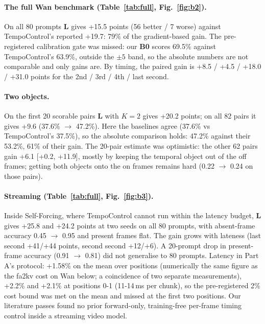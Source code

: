 \documentclass[10pt,a4paper]{article}
\newcommand{\arm}[1]{\textbf{#1}}
\begin{document}
\paragraph{The full Wan benchmark (Table~\ref{tab:full}, Fig.~\ref{fig:b2}).} On all 80 prompts \arm{L} gives +15.5 points (56 better / 7 worse) against TempoControl's reported +19.7: 79\% of the gradient-based gain. The pre-registered calibration gate was missed: our \arm{B0} scores 69.5\% against TempoControl's 63.9\%, outside the $\pm5$ band, so the absolute numbers are not comparable and only gains are. By timing, the paired gain is +8.5 / +4.5 / +18.0 / +31.0 points for the 2nd / 3rd / 4th / last second.

\paragraph{Two objects.} On the first 20 scorable pairs \arm{L} with $K=2$ gives +20.2 points; on all 82 pairs it gives +9.6 (37.6\% $\to$ 47.2\%). Here the baselines agree (37.6\% vs TempoControl's 37.5\%), so the absolute comparison holds: 47.2\% against their 53.2\%, 61\% of their gain. The 20-pair estimate was optimistic: the other 62 pairs gain +6.1 [+0.2, +11.9], mostly by keeping the temporal object out of the off frames; getting both objects onto the on frames remains hard (0.22 $\to$ 0.24 on those pairs).

\paragraph{Streaming (Table~\ref{tab:full}, Fig.~\ref{fig:b3}).} Inside Self-Forcing, where TempoControl cannot run within the latency budget, \arm{L} gives +25.8 and +24.2 points at two seeds on all 80 prompts, with absent-frame accuracy 0.45 $\to$ 0.95 and present frames flat. The gain grows with lateness (last second +41/+44 points, second second +12/+6). A 20-prompt drop in present-frame accuracy (0.91 $\to$ 0.81) did not generalise to 80 prompts. Latency in Part A's protocol: +1.58\% on the mean over positions (numerically the same figure as the fa2kv cost on Wan below; a coincidence of two separate measurements), +2.2\% and +2.1\% at positions 0-1 (11-14\,ms per chunk), so the pre-registered 2\% cost bound was met on the mean and missed at the first two positions. Our literature passes found no prior forward-only, training-free per-frame timing control inside a streaming video model.
\end{document}
